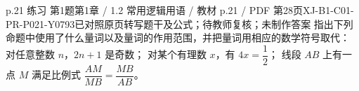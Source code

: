 \par\noindent\begin{minipage}{\linewidth}
\begin{bankitem}{p.21 练习 第1题}{第1章 / 1.2 常用逻辑用语 / 教材 p.21 / PDF 第28页}{XJ-B1-C01-PR-P021-Y0793}{已对照原页转写题干及公式；待教师复核；未制作答案}
指出下列命题中使用了什么量词以及量词的作用范围，并把量词用相应的数学符号取代：
对任意整数 $n$，$2n+1$ 是奇数；
对某个有理数 $x$，有 $4x=\dfrac12$；
线段 $AB$ 上有一点 $M$ 满足比例式 $\dfrac{AM}{MB}=\dfrac{MB}{AB}$。
\end{bankitem}
\end{minipage}\par\medskip
